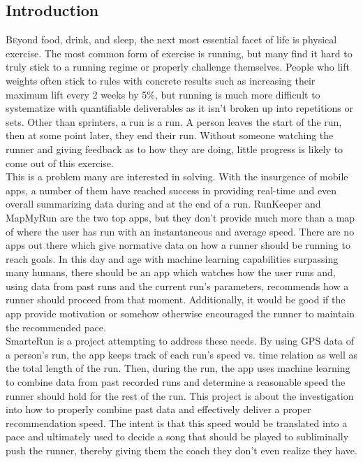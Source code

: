 \documentclass[twoside]{article}
\begin{document}
\begin{multicols}{2} %

\section{Introduction}

\lettrine[nindent=0em,lines=3]{B} eyond food, drink, and sleep, the next most essential facet of life is physical exercise. The most common form of exercise is running, but many find it hard to truly stick to a running regime or properly challenge themselves. People who lift weights often stick to rules with concrete results such as increasing their maximum lift every 2 weeks by 5\%, but running is much more difficult to systematize with quantifiable deliverables as it isn't broken up into repetitions or sets. Other than sprinters, a run is a run. A person leaves the start of the run, then at some point later, they end their run. Without someone watching the runner and giving feedback as to how they are doing, little progress is likely to come out of this exercise. \\

This is a problem many are interested in solving. With the insurgence of mobile apps, a number of them have reached success in providing real-time and even overall summarizing data during and at the end of a run. RunKeeper and MapMyRun are the two top apps, but they don't provide much more than a map of where the user has run with an instantaneous and average speed. There are no apps out there which give normative data on how a runner should be running to reach goals. In this day and age with machine learning capabilities surpassing many humans, there should be an app which watches how the user runs and, using data from past runs and the current run's parameters, recommends how a runner should proceed from that moment. Additionally, it would be good if the app provide motivation or somehow otherwise encouraged the runner to maintain the recommended pace. \\

	SmarteRun is a project attempting to address these needs. By using GPS data of a person's run, the app keeps track of each run's speed vs. time relation as well as the total length of the run. Then, during the run, the app uses machine learning to combine data from past recorded runs and determine a reasonable speed the runner should hold for the rest of the run. This project is about the investigation into how to properly combine past data and effectively deliver a proper recommendation speed. The intent is that this speed would be translated into a pace and ultimately used to decide a song that should be played to subliminally push the runner, thereby giving them the coach they don't even realize they have. 



\end{multicols}
\end{document}
